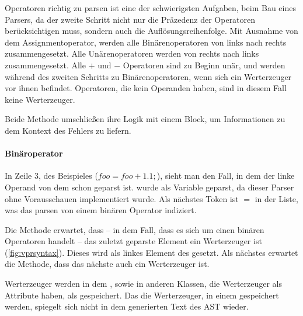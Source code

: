 {{{      Operatoren richtig zu parsen ist eine der schwierigsten Aufgaben, beim Bau eines Parsers, da der zweite Schritt nicht nur die Präzedenz der Operatoren berücksichtigen muss, sondern auch die Auflösungsreihenfolge. Mit Ausnahme von dem Assignmentoperator, werden alle Binärenoperatoren von links nach rechts zusammengesetzt. Alle Unärenoperatoren werden von rechts nach links zusammengesetzt. Alle \myMIn$+$ und \myMIn$-$ Operatoren sind zu Beginn unär, und werden während des zweiten Schritts zu Binärenoperatoren, wenn sich ein Werterzeuger vor ihnen befindet. Operatoren, die kein Operanden haben, sind in diesem Fall keine Werterzeuger.

      Beide Methode umschließen ihre Logik mit einem  Block, um Informationen zu dem Kontext des Fehlers zu liefern.

      \paragraph{Binäroperator}
        In Zeile 3, des Beispieles (\myMIn$foo = foo + 1.1;$), sieht man den Fall, in dem der linke Operand von dem  schon geparst ist.  wurde als Variable geparst, da dieser Parser ohne Vorausschauen implementiert wurde. Als nächstes Token ist \myTIn$=$ in der Liste, was das parsen von einem binären Operator indiziert.

        Die  Methode erwartet, dass -- in dem Fall, dass es sich um einen binären Operatoren handelt -- das zuletzt geparste Element ein Werterzeuger ist (\autoref{fig:vprsyntax}). Dieses wird als linkes Element des  gesetzt. Als nächstes erwartet die Methode, dass das nächste  auch ein Werterzeuger ist.

        Werterzeuger werden in dem , sowie in anderen Klassen, die Werterzeuger als Attribute haben, als  gespeichert. Das die Werterzeuger, in einem  gespeichert werden, spiegelt sich nicht in dem generierten Text des AST wieder.

}}}
